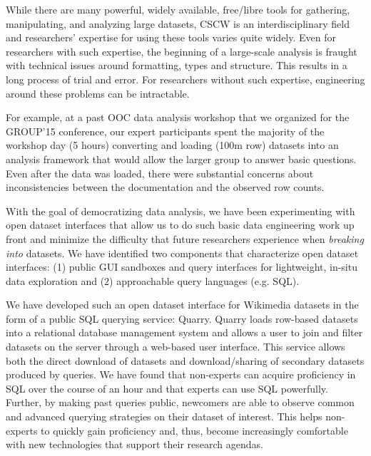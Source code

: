 While there are many powerful, widely available, free/libre tools for gathering, manipulating, and analyzing large datasets, CSCW is an interdisciplinary field and  researchers' expertise for using these tools varies quite widely.  Even for researchers with such expertise, the beginning of a large-scale analysis is fraught with technical issues around formatting, types and structure.  This results in a long process of trial and error. For researchers without such expertise, engineering around these problems can be intractable.

For example, at a past OOC data analysis workshop that we organized for the GROUP'15 conference, our expert participants spent the majority of the workshop day (5 hours) converting and loading (100m row) datasets into an analysis framework that would allow the larger group to answer basic questions.  Even after the data was loaded, there were substantial concerns about inconsistencies between the documentation and the observed row counts.

With the goal of democratizing data analysis, we have been experimenting with open dataset interfaces that allow us to do such basic data engineering work up front and minimize the difficulty that future researchers experience when \emph{breaking into} datasets.  We have identified two components that characterize open dataset interfaces: (1) public GUI sandboxes and query interfaces for lightweight, in-situ data exploration and (2) approachable query languages (e.g. SQL).

We have developed such an open dataset interface for Wikimedia datasets in the form of a public SQL querying service: Quarry.  Quarry loads row-based datasets into a relational database management system and allows a user to join and filter datasets on the server through a web-based user interface.  This service allows both the direct download of datasets and download/sharing of secondary datasets produced by queries.  We have found that non-experts can acquire proficiency in SQL over the course of an hour and that experts can use SQL powerfully.  Further, by making past queries public, newcomers are able to observe common and advanced querying strategies on their dataset of interest. This helps non-experts to quickly gain proficiency and, thus, become increasingly comfortable with new technologies that support their research agendas.

